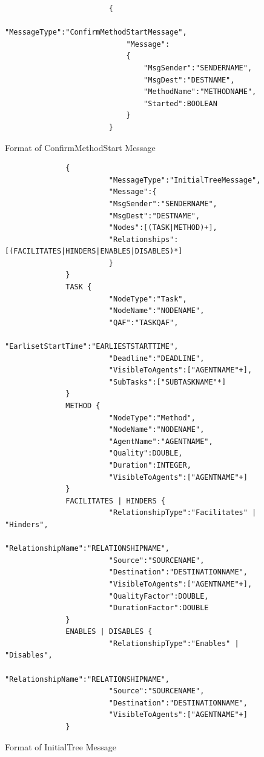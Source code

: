 \begin{enumerate}
\begin{figure}[H]
\centering
\begin{verbatim}
                        {
	                        "MessageType":"ConfirmMethodStartMessage",
 	                        "Message":
 	                        {
 	                        	"MsgSender":"SENDERNAME",
 	                        	"MsgDest":"DESTNAME",
 	                        	"MethodName":"METHODNAME",
 	                        	"Started":BOOLEAN
 	                        }
                        }
\end{verbatim}
\caption{Format of ConfirmMethodStart Message}
\label{fig:ConfirmMethodStart}
\end{figure}

\begin{figure}[H]
\begin{verbatim}
              {
                        "MessageType":"InitialTreeMessage",
                        "Message":{
                        "MsgSender":"SENDERNAME",
                        "MsgDest":"DESTNAME",
                        "Nodes":[(TASK|METHOD)+],
                        "Relationships":[(FACILITATES|HINDERS|ENABLES|DISABLES)*]
                        }
              }
              TASK {
                        "NodeType":"Task",
                        "NodeName":"NODENAME",
                        "QAF":"TASKQAF",
                        "EarlisetStartTime":"EARLIESTSTARTTIME",
                        "Deadline":"DEADLINE",
                        "VisibleToAgents":["AGENTNAME"+],
                        "SubTasks":["SUBTASKNAME"*]
              }
              METHOD {
                        "NodeType":"Method",
                        "NodeName":"NODENAME",
                        "AgentName":"AGENTNAME",
                        "Quality":DOUBLE,
                        "Duration":INTEGER,
                        "VisibleToAgents":["AGENTNAME"+]
              }
              FACILITATES | HINDERS {
                        "RelationshipType":"Facilitates" | "Hinders",
                        "RelationshipName":"RELATIONSHIPNAME",
                        "Source":"SOURCENAME",
                        "Destination":"DESTINATIONNAME",
                        "VisibleToAgents":["AGENTNAME"+],
                        "QualityFactor":DOUBLE,
                        "DurationFactor":DOUBLE
              }
              ENABLES | DISABLES {
                        "RelationshipType":"Enables" | "Disables",
                        "RelationshipName":"RELATIONSHIPNAME",
                        "Source":"SOURCENAME",
                        "Destination":"DESTINATIONNAME",
                        "VisibleToAgents":["AGENTNAME"+]
              }
\end{verbatim}
\caption{Format of InitialTree Message}
\label{fig:InitialTreeMessage}
\end{figure}


\end{enumerate}
